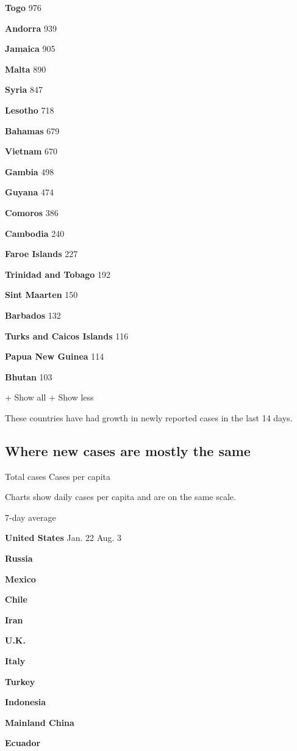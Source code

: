 \textbf{Togo} 976

\textbf{Andorra} 939

\textbf{Jamaica} 905

\textbf{Malta} 890

\textbf{Syria} 847

\textbf{Lesotho} 718

\textbf{Bahamas} 679

\textbf{Vietnam} 670

\textbf{Gambia} 498

\textbf{Guyana} 474

\textbf{Comoros} 386

\textbf{Cambodia} 240

\textbf{Faroe Islands} 227

\textbf{Trinidad and Tobago} 192

\textbf{Sint Maarten} 150

\textbf{Barbados} 132

\textbf{Turks and Caicos Islands} 116

\textbf{Papua New Guinea} 114

\textbf{Bhutan} 103

+ Show all + Show less

These countries have had growth in newly reported cases in the last 14
days.

\hypertarget{where-new-cases-are-mostly-the-same}{%
\subsection{Where new cases are mostly the
same}\label{where-new-cases-are-mostly-the-same}}

Total cases Cases per capita

Charts show daily cases per capita and are on the same scale.

7-day average

\textbf{United States} Jan. 22 Aug. 3

\textbf{Russia}

\textbf{Mexico}

\textbf{Chile}

\textbf{Iran}

\textbf{U.K.}

\textbf{Italy}

\textbf{Turkey}

\textbf{Indonesia}

\textbf{Mainland China}

\textbf{Ecuador}

